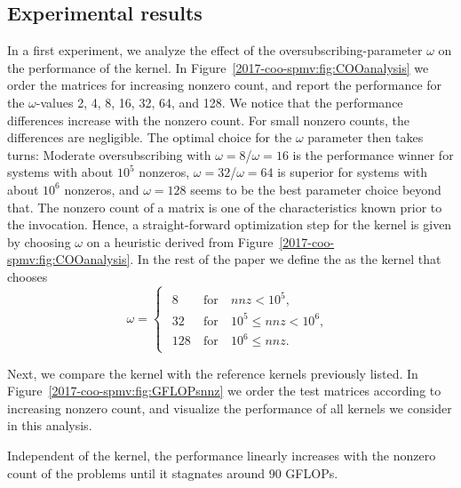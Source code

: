 \subsection{Experimental results}
In a first experiment, we analyze the effect of the oversubscribing-parameter $\omega$ 
on the performance of the \coo kernel.
In Figure~\ref{2017-coo-spmv:fig:COOanalysis} we order the matrices for increasing nonzero count, 
and report the performance for the $\omega$-values 2, 4, 8, 16, 32, 64, and 128.
We notice that the performance differences increase with the
nonzero count. For small nonzero counts, the differences are negligible. 
The optimal choice for the $\omega$ parameter then takes turns: 
Moderate oversubscribing with $\omega=8$/$\omega=16$ 
is the performance winner for systems with about $10^5$ nonzeros,
$\omega=32$/$\omega=64$ is superior for systems with about $10^6$ nonzeros,
and $\omega=128$ seems to be the best parameter choice beyond that.
The nonzero count of a matrix is one of the characteristics known prior
to the \spmv invocation. 
Hence, a straight-forward optimization step for the \coo kernel is given 
by choosing $\omega$ on a heuristic derived from Figure~\ref{2017-coo-spmv:fig:COOanalysis}.
In the rest of the paper we define the \coo as the kernel that chooses 
\[
\omega =
\begin{cases}
\begin{array}{lll}
8 & \mathrm{\ for\ } & nnz<10^5,\\
32 & \mathrm{\ for\ } & 10^5 \leq nnz<10^6,\\
128 & \mathrm{\ for\ }&10^6 \leq nnz.
\end{array}
\end{cases}
\]

Next, we compare the \coo kernel with the reference kernels previously listed. 
In Figure~\ref{2017-coo-spmv:fig:GFLOPsnnz} we order the test matrices according to increasing nonzero count,
and visualize the performance of all \spmv kernels we consider in this analysis. 

Independent of the \spmv kernel, the performance linearly increases with the nonzero count of the problems until it stagnates around 90 GFLOPs. 

